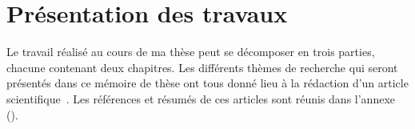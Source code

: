 %
%
%
%
%







\casse


\section{Présentation des travaux}%

Le travail réalisé au cours de ma thèse peut se décomposer en trois parties, chacune contenant deux chapitres.
Les différents thèmes de recherche qui seront présentés dans ce mémoire de thèse ont tous donné lieu à la rédaction d'un article scientifique~\cite{LWR05,LRW06,RWC06,RLC06,CKR08,RLW07,CJK08,ReG08}. Les références et résumés de ces articles sont réunis dans l'annexe~ ().

{\AjouteLigne}

